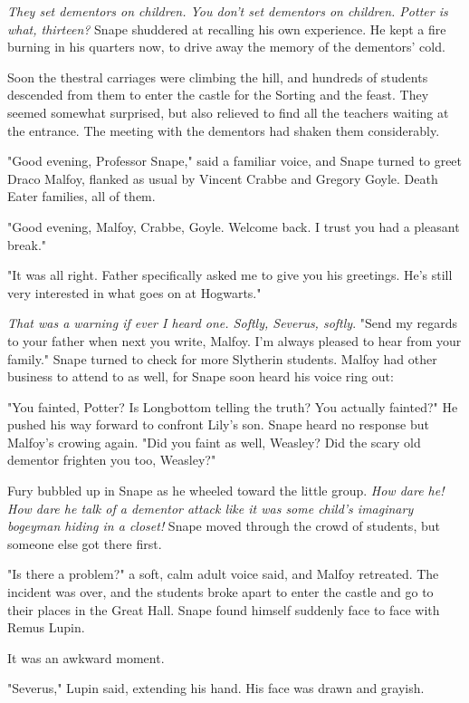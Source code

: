 \emph{They set dementors on children. You don't set dementors on children. Potter is what, thirteen?} Snape shuddered at recalling his own experience. He kept a fire burning in his quarters now, to drive away the memory of the dementors' cold.

Soon the thestral carriages were climbing the hill, and hundreds of students descended from them to enter the castle for the Sorting and the feast. They seemed somewhat surprised, but also relieved to find all the teachers waiting at the entrance. The meeting with the dementors had shaken them considerably.

"Good evening, Professor Snape," said a familiar voice, and Snape turned to greet Draco Malfoy, flanked as usual by Vincent Crabbe and Gregory Goyle. Death Eater families, all of them.

"Good evening, Malfoy, Crabbe, Goyle. Welcome back. I trust you had a pleasant break."

"It was all right. Father specifically asked me to give you his greetings. He's still very interested in what goes on at Hogwarts."

\emph{That was a warning if ever I heard one. Softly, Severus, softly}. "Send my regards to your father when next you write, Malfoy. I'm always pleased to hear from your family." Snape turned to check for more Slytherin students. Malfoy had other business to attend to as well, for Snape soon heard his voice ring out:

"You fainted, Potter? Is Longbottom telling the truth? You actually fainted?" He pushed his way forward to confront Lily's son. Snape heard no response but Malfoy's crowing again. "Did you faint as well, Weasley? Did the scary old dementor frighten you too, Weasley?"

Fury bubbled up in Snape as he wheeled toward the little group. \emph{How dare he! How dare he talk of a dementor attack like it was some child's imaginary bogeyman hiding in a closet!} Snape moved through the crowd of students, but someone else got there first.

"Is there a problem?" a soft, calm adult voice said, and Malfoy retreated. The incident was over, and the students broke apart to enter the castle and go to their places in the Great Hall. Snape found himself suddenly face to face with Remus Lupin.

It was an awkward moment.

"Severus," Lupin said, extending his hand. His face was drawn and grayish.

